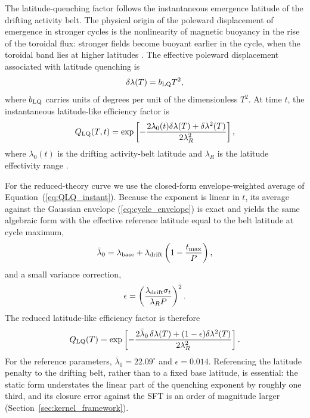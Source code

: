 \documentclass[namedreferences,hyperref,optionalrh,solaromanenum]{spr-sola}
\begin{document}
The latitude-quenching factor follows the instantaneous emergence latitude
of the drifting activity belt. The physical origin of the poleward
displacement of emergence in stronger cycles is the nonlinearity of
magnetic buoyancy in the rise of the toroidal flux: stronger fields become
buoyant earlier in the cycle, when the toroidal band lies at higher
latitudes \citep{Biswas2022}. The effective poleward displacement
associated with latitude quenching is
%
\begin{equation}
\delta\lambda(T)=b_{\rm LQ}T^2,
\label{eq:lq_delta}
\end{equation}
%
where $b_{\rm LQ}$ carries units of degrees per unit of the dimensionless
$T^2$. At time $t$, the instantaneous latitude-like efficiency factor is
%
\begin{equation}
Q_{\rm LQ}(T,t)
=
\exp
\left[
-
\frac{
2\lambda_0(t)\delta\lambda(T)
+
\delta\lambda^2(T)
}
{2\lambda_R^2}
\right],
\label{eq:QLQ_instant}
\end{equation}
%
where $\lambda_0(t)$ is the drifting activity-belt latitude and
$\lambda_R$ is the latitude effectivity range
\citep{PetrovayNagyYeates2020,Talafha2022}.

For the reduced-theory curve we use the closed-form envelope-weighted
average of Equation~(\ref{eq:QLQ_instant}). Because the exponent is linear
in $t$, its average against the Gaussian envelope
(\ref{eq:cycle_envelope}) is exact and yields the same algebraic form with
the effective reference latitude equal to the belt latitude at cycle
maximum,
%
\begin{equation}
\bar{\lambda}_0
=
\lambda_{\rm base}
+
\lambda_{\rm drift}
\left(
1-\frac{t_{\rm max}}{P}
\right),
\label{eq:lq_lambda_eff}
\end{equation}
%
and a small variance correction,
%
\begin{equation}
\epsilon
=
\left(
\frac{
\lambda_{\rm drift}\sigma_t
}
{
\lambda_R P
}
\right)^2 .
\label{eq:lq_epsilon}
\end{equation}
%
The reduced latitude-like efficiency factor is therefore
%
\begin{equation}
Q_{\rm LQ}(T)
=
\exp
\left[
-
\frac{
2\bar{\lambda}_0\,\delta\lambda(T)
+
(1-\epsilon)\delta\lambda^2(T)
}
{2\lambda_R^2}
\right].
\label{eq:QLQ_belt}
\end{equation}
%
For the reference parameters, $\bar{\lambda}_0=22.09^\circ$ and
$\epsilon=0.014$. Referencing the latitude penalty to the drifting belt,
rather than to a fixed base latitude, is essential: the static form
understates the linear part of the quenching exponent by roughly one
third, and its closure error against the SFT is an order of magnitude
larger (Section~\ref{sec:kernel_framework}).
\end{document}

